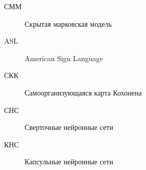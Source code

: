 \Abbreviations %
\begin{description}
\item[СММ] Скрытая марковская модель
\item[ASL] American Sign Language
\item[СКК] Самоорганизующаяся карта Кохонена
\item[СНС] Сверточные нейронные сети
\item[КНС] Капсульные нейронные сети
\end{description}

